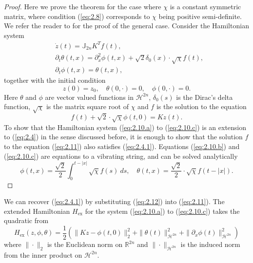 \begin{proof}
Here we prove the theorem for the case where $\chi$ is a constant symmetric matrix, where condition (\ref{eq:2.8}) corresponds to $\chi$ being positive semi-definite. We refer the reader to \cite{Figotin:2006jy} for the proof of the general case. Consider the Hamiltonian system
\begin{subequations}
\begin{align}
		\label{eq:2.10.a} & \dot{z}(t) = \mathbb J_{2n} K^T f(t), \\
		\label{eq:2.10.b} & \partial_t \theta(t,x) = \partial_x^2 \phi(t,x) + \sqrt 2 \delta_0(x) \cdot \sqrt{\chi}  f(t), \\
		\label{eq:2.10.c} & \partial_t \phi(t,x) = \theta(t,x),
\end{align}
\end{subequations}
together with the initial condition
\begin{equation} \label{eq:2.10.1}
	z(0) = z_0,\quad \theta(0,\cdot) = 0, \quad \phi(0,\cdot) = 0.
\end{equation}
Here $\theta$ and $\phi$ are vector valued functions in $\mathcal H^{2n}$, $\delta_0(s)$ is the Dirac's delta function, $\sqrt{ \chi}$ is the matrix square root of $\chi$ and $f$ is the solution to the equation
\begin{equation} \label{eq:2.11}
	f(t) + \sqrt{2} \cdot \sqrt{ \chi } \phi(t,0) = Kz(t).
\end{equation}
To show that the Hamiltonian system (\ref{eq:2.10.a}) to (\ref{eq:2.10.c}) is an extension to (\ref{eq:2.4}) in the sense discussed before, it is enough to show that the solution $f$ to the equation (\ref{eq:2.11}) also satisfies (\ref{eq:2.4.1}). Equations (\ref{eq:2.10.b}) and (\ref{eq:2.10.c}) are equations to a vibrating string, and can be solved analytically
\begin{equation} \label{eq:2.12}
	\phi(t,x) = \frac {\sqrt 2} 2 \int_0^{t-|x|} \sqrt{\chi} f(s)\ ds,\quad \theta(t,x) = \frac{\sqrt 2}{2} \cdot \sqrt{\chi} f(t - |x|).
\end{equation}
\end{proof}
We can recover (\ref{eq:2.4.1}) by substituting (\ref{eq:2.12}) into (\ref{eq:2.11}). The extended Hamiltonian $H_\text{ex}$ for the system (\ref{eq:2.10.a}) to (\ref{eq:2.10.c}) takes the quadratic from
\begin{equation} \label{eq:2.13}
	H_\text{ex}(z,\phi,\theta) = \frac 1 2 \left( \| Kz - \phi(t,0) \|_2^2 + \| \theta(t) \|^2_{\mathcal H^{2n} } + \| \partial_x\phi(t)\|^2_{\mathcal H^{2n} }\right)
\end{equation}
where $\| \cdot \|_2$ is the Euclidean norm on $\mathbb R^{2n}$ and $\| \cdot \|_{\mathcal H^{2n}}$ is the induced norm from the inner product on $\mathcal H^{2n}$. 

